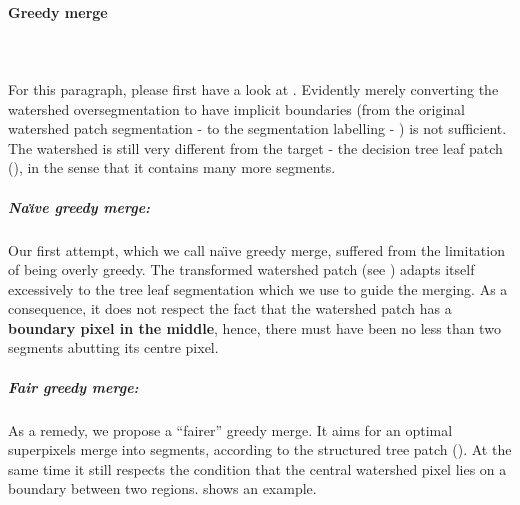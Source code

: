 \paragraph{Greedy merge}\mbox{}\\\mbox{}\\ %
For this paragraph, please first have a look at . Evidently merely converting the watershed oversegmentation to have implicit boundaries (from the original watershed patch segmentation -  to the segmentation labelling - ) is not sufficient. The watershed is still very different from the target - the decision tree leaf patch (), in the sense that it contains many more segments.

\subparagraph{Na\"{\i}ve greedy merge:} Our first attempt, which we call na\"{\i}ve greedy merge, suffered from the limitation of being overly 
greedy. The transformed watershed patch (see ) adapts itself excessively to the tree leaf segmentation which we use to guide the merging. As a consequence, it does not respect the fact that the watershed patch has a \textbf{boundary pixel in the middle}, hence, there must have been no less than two segments abutting its centre pixel.

\subparagraph{Fair greedy merge:} As a remedy, we propose a ``fairer'' greedy merge. It %
aims for an optimal superpixels merge into segments, according to the structured tree patch (). At the same time it still respects the condition that the central watershed pixel lies on a boundary between two regions.  shows an example.

